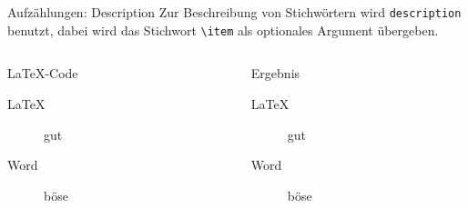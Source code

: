 \begin{frame}[fragile]{Aufzählungen: Description}
  Zur Beschreibung von Stichwörtern wird \texttt{description} benutzt, dabei wird das
Stichwort \verb-\item- als optionales Argument übergeben.
  \begin{columns}[t]
    \begin{column}{0.47\textwidth}
      \begin{block}{\LaTeX-Code}
        \begin{lstverbatim}
        \begin{description}
          \item[\LaTeX] gut
          \item[Word] böse
        \end{description}
        \end{lstverbatim}
      \end{block}
    \end{column}
    \begin{column}{0.47\textwidth}
      \begin{block}{Ergebnis}
        \begin{description}
          \item[\LaTeX] gut
          \item[Word] böse
        \end{description}
      \end{block}
    \end{column}
  \end{columns}
\end{frame}
